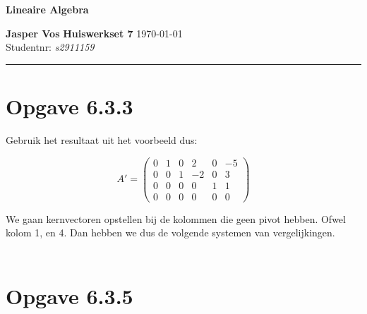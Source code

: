\documentclass{article}
\begin{document}
{\Large \textbf{Lineaire Algebra}}

\bigskip

\textbf{Jasper Vos} \hfill \textbf{Huiswerkset 7} \hfill \today \\
Studentnr: \emph{s2911159}

\rule{\textwidth}{2pt}

\bigskip

\section*{Opgave 6.3.3}
Gebruik het resultaat uit het voorbeeld dus:

\[A' = \begin{pmatrix}
    0 & 1 & 0 & 2 & 0 & -5 \\
    0 & 0 & 1 & -2 & 0 & 3 \\
    0 & 0 & 0 & 0 & 1 & 1 \\
    0 & 0 & 0 & 0 & 0 & 0
\end{pmatrix}\]

We gaan kernvectoren opstellen bij de kolommen die geen pivot hebben. Ofwel kolom 1, en 4.
Dan hebben we dus de volgende systemen van vergelijkingen.

\begin{align*}
\end{align*}

\section*{Opgave 6.3.5}
\end{document}
